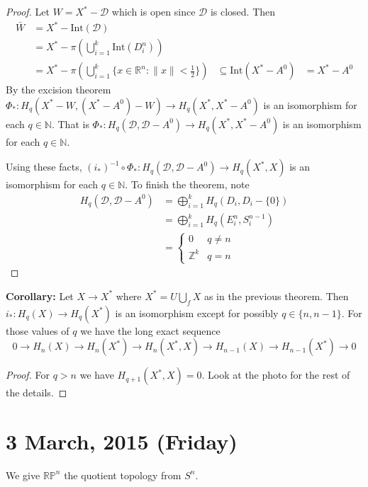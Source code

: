 \documentclass{article}
\begin{document}
\begin{proof}
Let $W = X^* - \mathcal{D}$ which is open since $\mathcal{D}$ is closed. Then 
\begin{align*}
\bar{W} &= X^* - \text{Int}(\mathcal{D}) \\
&= X^* - \pi(\bigcup_{i=1}^k\text{Int}(D^n_i)) \\
&= X^* - \pi(\bigcup_{i=1}^k \{ x \in \mathbb{R}^n : \| x \| < \frac{1}{2} \})
& \subseteq \text{Int}(X^* - A^0)
& = X^* - A^0
\end{align*}
By the excision theorem $\Phi_*: H_q(X^* - W, (X^* - A^0) - W) \to H_q(X^*, X^* - A^0)$ is an isomorphism for each $q \in \mathbb{N}$. That is $\Phi_*: H_q(\mathcal{D}, \mathcal{D} - A^0) \to H_q(X^*, X^* - A^0)$ is an isomorphism for each $q \in \mathbb{N}$.

Using these facts, $(i_*)^{-1} \circ \Phi_*: H_q(\mathcal{D}, \mathcal{D} - A^0) \to H_q(X^*, X)$ is an isomorphism for each $q \in \mathbb{N}$. To finish the theorem, note
\begin{align*}
H_q(\mathcal{D}, \mathcal{D} - A^0) & = \bigoplus_{i = 1}^kH_q(D_i, D_i - \{ 0 \}) \\
& = \bigoplus_{i=1}^k H_q(E^n_i, S^{n-1}_i) \\
& = \begin{cases}
0 & q \neq n \\
\mathbb{Z}^k & q = n
\end{cases}
\end{align*}
\end{proof}

\textbf{Corollary:} Let $X \to X^*$ where $X^* = U \bigcup_f X$ as in the previous theorem. Then $i_*: H_q(X) \to H_q(X^*)$ is an isomorphism except for possibly $q \in \{ n, n-1 \}$. For those values of $q$ we have the long exact sequence
\[
0 \to H_n(X) \to H_n(X^*) \to H_n(X^*, X) \to H_{n-1}(X) \to H_{n-1}(X^*) \to 0
\]
\begin{proof}
For $q > n$ we have $H_{q+1}(X^*, X) = 0$. Look at the photo for the rest of the details.
\end{proof}

\section{3 March, 2015 (Friday)}
We give $\mathbb{RP}^n$ the quotient topology from $S^n$.
\end{document}
